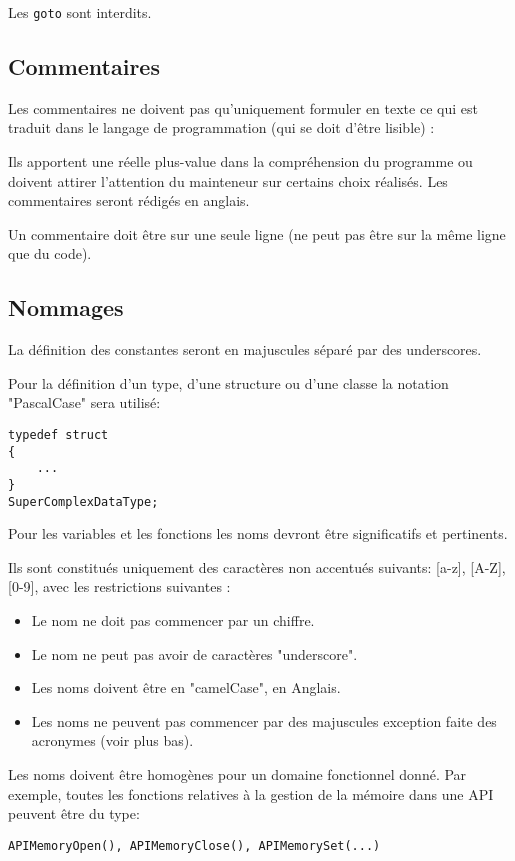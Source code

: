 Les \texttt{goto} sont interdits.

\subsection{Commentaires}
Les commentaires ne doivent pas qu’uniquement formuler en texte ce qui est traduit
dans le langage de programmation (qui se doit d'être lisible) :

Ils apportent une réelle plus-value dans la compréhension du programme ou doivent
attirer l’attention du mainteneur sur certains choix réalisés. Les commentaires seront 
rédigés en anglais.

Un commentaire doit être sur une seule ligne (ne peut pas être sur la même ligne 
que du code).
 
\subsection{Nommages}
La définition des constantes seront en majuscules séparé par des underscores.

Pour la définition d'un type, d'une structure ou d'une classe la notation "PascalCase"
sera utilisé: 
\begin{verbatim}
typedef struct 
{
    ...
}
SuperComplexDataType;
\end{verbatim}

Pour les variables et les fonctions les noms devront être significatifs et 
pertinents.

Ils sont constitués uniquement des caractères non accentués suivants: 
[a-z], [A-Z], [0-9], avec les restrictions suivantes :
\begin{itemize}
	\item Le nom ne doit pas commencer par un chiffre.
	\item Le nom ne peut pas avoir de caractères "underscore".
	\item Les noms doivent être en "camelCase", en Anglais.
	\item Les noms ne peuvent pas commencer par des majuscules exception faite
          des acronymes (voir plus bas).
\end{itemize}
Les noms doivent être homogènes pour un domaine fonctionnel donné. Par exemple, 
toutes les fonctions relatives à la gestion de la mémoire dans une API peuvent 
être du type: \newline 
\begin{verbatim}
APIMemoryOpen(), APIMemoryClose(), APIMemorySet(...)
\end{verbatim}

